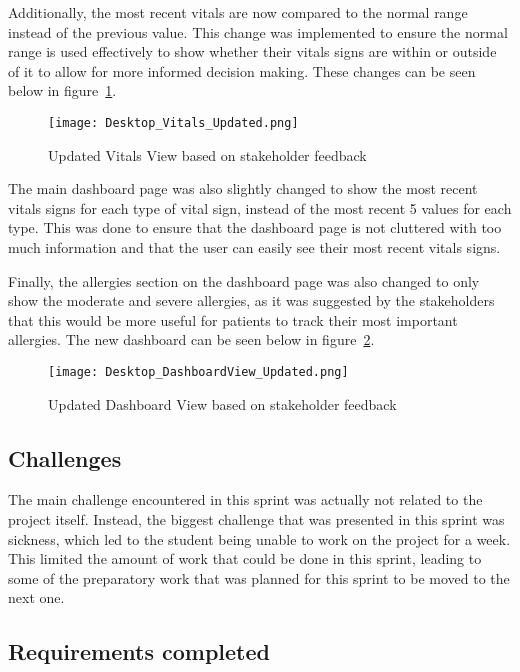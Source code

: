 Additionally, the most recent vitals are now compared to the normal range instead of the previous value. This change was implemented to ensure the normal range is used effectively to show whether their vitals signs are within or outside of it to allow for more informed decision making. These changes can be seen below in figure~\ref{fig:vitalchanges}.

\begin{figure}[htbp]
  \centering
  \texttt{[image: Desktop\_Vitals\_Updated.png]}
  \caption{Updated Vitals View based on stakeholder feedback}\label{fig:vitalchanges}
\end{figure}

\FloatBarrier{}

The main dashboard page was also slightly changed to show the most recent vitals signs for each type of vital sign, instead of the most recent 5 values for each type. This was done to ensure that the dashboard page is not cluttered with too much information and that the user can easily see their most recent vitals signs.

Finally, the allergies section on the dashboard page was also changed to only show the moderate and severe allergies, as it was suggested by the stakeholders that this would be more useful for patients to track their most important allergies. The new dashboard can be seen below in figure~\ref{fig:dashboardchanges}.

\begin{figure}[htbp]
  \centering
  \texttt{[image: Desktop\_DashboardView\_Updated.png]}
  \caption{Updated Dashboard View based on stakeholder feedback}\label{fig:dashboardchanges}
\end{figure}

\FloatBarrier{}

\subsection{Challenges}

The main challenge encountered in this sprint was actually not related to the project itself. Instead, the biggest challenge that was presented in this sprint was sickness, which led to the student being unable to work on the project for a week. This limited the amount of work that could be done in this sprint, leading to some of the preparatory work that was planned for this sprint to be moved to the next one.

\subsection{Requirements completed}

